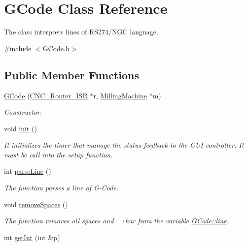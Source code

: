 \hypertarget{class_g_code}{\section{G\+Code Class Reference}
\label{class_g_code}
}


The class interprets lines of R\+S274/\+N\+G\+C language.  




{\ttfamily \#include $<$G\+Code.\+h$>$}

\subsection*{Public Member Functions}
\begin{DoxyCompactItemize}
\item 
\hyperlink{class_g_code_af858c34e69c72eff51299630c1a5fb05}{G\+Code} (\hyperlink{class_c_n_c___router___i_s_r}{C\+N\+C\+\_\+\+Router\+\_\+\+I\+S\+R} $\ast$r, \hyperlink{class_milling_machine}{Milling\+Machine} $\ast$m)
\begin{DoxyCompactList}\small\item\em Constructor. \end{DoxyCompactList}\item 
void \hyperlink{class_g_code_abc56435b1563d3bb078ebae3d1844d9a}{init} ()
\begin{DoxyCompactList}\small\item\em It initializes the timer that manage the status feedback to the G\+U\+I controller. It mast be call into the setup function. \end{DoxyCompactList}\item 
int \hyperlink{class_g_code_a1785db665332977787a38b6b2563b395}{parse\+Line} ()
\begin{DoxyCompactList}\small\item\em The function parses a line of G-\/\+Code. \end{DoxyCompactList}\item 
void \hyperlink{class_g_code_a3912e1dad7257e2336ab09c55ff17235}{remove\+Spaces} ()
\begin{DoxyCompactList}\small\item\em The function removes all spaces and  ~\newline
 char from the variable \hyperlink{class_g_code_a20d7c90740e9e139b24f68336ad8c8f1}{G\+Code\+::line}. \end{DoxyCompactList}\item 
int \hyperlink{class_g_code_a71e259cc07dc7c1473d58cb70faa3630}{get\+Int} (int \&p)

\end{DoxyCompactItemize}
